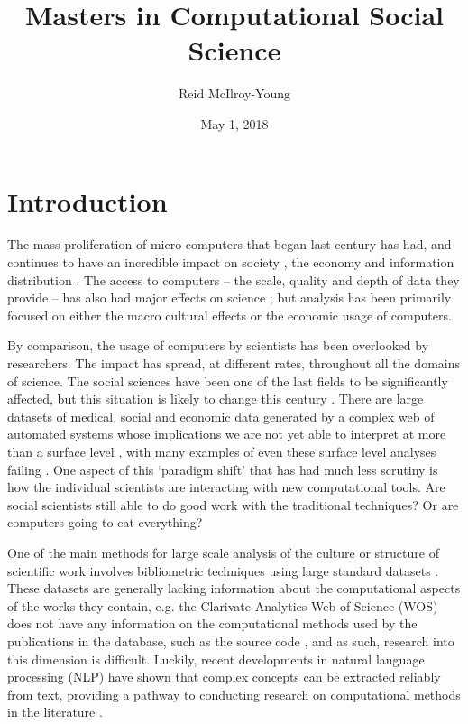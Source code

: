 \documentclass[12pt, a4paper]{article}
\author{Reid McIlroy-Young}
\title{Masters in Computational Social Science}
\date{May 1, 2018}
\begin{document}
\maketitle
\tableofcontents
\newpage
\listoffigures
\listoftables
\newpage
\doublespacing
\setcounter{page}{1}


\section{Introduction}

The mass proliferation of micro computers that began last century has had, and continues to have an incredible impact on society \citep{weizenbaum1972impact}, the economy \citep{gordon2000does} and information distribution \citep{berners2010world}. The access to computers -- the scale, quality and depth of data they provide -- has also had major effects on science \citep{lazer2009life}; but analysis has been primarily focused on either the macro cultural effects \citep{pfaffenberger1988social} or the economic usage \citep{landauer1995trouble} of computers.

By comparison, the usage of computers by scientists has been overlooked by researchers. The impact has spread, at different rates, throughout all the domains of science. The social sciences have been one of the last fields to be significantly affected, but this situation is likely to change this century \citep{watts2007twenty}. There are large datasets of medical, social and economic data generated by a complex web of automated systems whose implications we are not yet able to interpret at more than a surface level \citep{kossinets2006empirical} \citep{back2010emotional}, with many examples of even these surface level analyses failing \citep{lazer2014parable} \citep{kramer2014experimental}. One aspect of this `paradigm shift' that has had much less scrutiny is how the individual scientists are interacting with new computational tools. Are social scientists still able to do good work with the traditional techniques? Or are computers going to eat everything?

One of the main methods for large scale analysis of the culture or structure of scientific work involves bibliometric techniques \citep{de2009bibliometrics} using large standard datasets \citep[e.g.][]{Boyack2005, borner2010atlas, borner2015atlas, sugimoto2013global, shi2015weaving, evans_meta, skupin2013visualizing}. These datasets are generally lacking information about the computational aspects of the works they contain, e.g. the  Clarivate Analytics Web of Science (WOS) does not have any information on the computational methods used by the publications in the database, such as the source code \citep{mkdocs}, and as such, research into this dimension is difficult. Luckily, recent developments in natural language processing (NLP) have shown that complex concepts can be extracted reliably from text, providing a pathway to conducting research on computational methods in the literature \citep{evans2016machine} \citep{foster2015tradition}.
\end{document}
